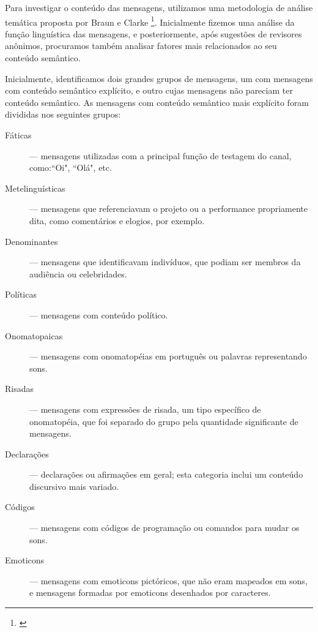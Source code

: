 Para investigar o conteúdo das mensagens, utilizamos uma metodologia de análise temática proposta por Braun e Clarke \footnote{\cite{Braun2006}}. Inicialmente fizemos uma análise da função linguística das mensagens, e posteriormente, após sugestões de revisores anônimos, procuramos também analisar fatores mais relacionados ao seu conteúdo semântico.



Inicialmente, identificamos dois grandes grupos de mensagens, um com mensagens com conteúdo semântico explícito, e outro cujas mensagens não pareciam ter conteúdo semântico. As mensagens com conteúdo semântico mais explícito foram divididas nos seguintes grupos:


\begin{description}
\item[Fáticas] --- mensagens utilizadas com a principal função de testagem do canal, como:``Oi", ``Olá", etc.
\item[Metelinguísticas] --- mensagens que referenciavam o projeto ou a performance propriamente dita, como comentários e elogios, por exemplo.
\item[Denominantes] --- mensagens que identificavam indivíduos, que podiam ser membros da audiência ou celebridades.
\item[Políticas] --- mensagens com conteúdo político.
\item[Onomatopaicas] --- mensagens com onomatopéias em português ou palavras representando sons.
\item[Risadas] --- mensagens com expressões de risada, um tipo específico de onomatopéia, que foi separado do grupo pela quantidade significante de mensagens. 
\item[Declarações] --- declarações ou afirmações em geral; esta categoria inclui um conteúdo discursivo mais variado.
\item[Códigos] --- mensagens com códigos de programação ou comandos para mudar os sons.
\item[Emoticons] --- mensagens com emoticons pictóricos, que não eram mapeados em sons, e mensagens formadas por emoticons desenhados por caracteres.
\end{description}

